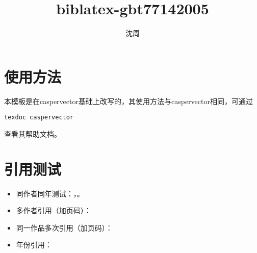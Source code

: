 \documentclass{ctexart}
\title{biblatex-gbt77142005}
\author{沈周}
\begin{document}
\maketitle
\section{使用方法}
本模板是在caspervector基础上改写的，其使用方法与caspervector相同，可通过
\begin{verbatim}
texdoc caspervector
\end{verbatim}
查看其帮助文档。
\section{引用测试}
\begin{itemize}
    \item 同作者同年测试：\cite{2-5}，\cite{2-5_2}。
    \item 多作者引用（加页码）：\cite[][23]{a5-3} \cite{a1-2}
    \item 同一作品多次引用（加页码）：\cite[][23]{a5-3}\cite[][32]{a5-3}
    \item 年份引用：
\end{itemize}
\nocite{*}
\printbibliography[title={参考文献},heading=bibintoc]
\end{document}
